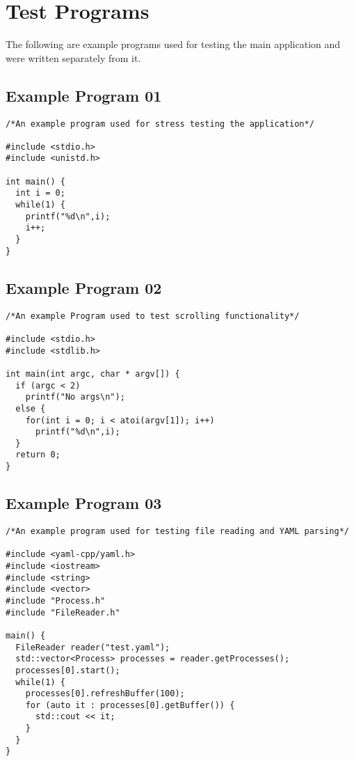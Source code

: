 \section{Test Programs}

The following are example programs used for testing the main application and were written separately from it.

\subsection{Example Program 01}

\begin{verbatim}
/*An example program used for stress testing the application*/

#include <stdio.h>
#include <unistd.h>

int main() {
  int i = 0;
  while(1) {
    printf("%d\n",i);
    i++;
  }
}
\end{verbatim}

\subsection{Example Program 02}

\begin{verbatim}
/*An example Program used to test scrolling functionality*/

#include <stdio.h>
#include <stdlib.h>

int main(int argc, char * argv[]) {
  if (argc < 2)
    printf("No args\n");
  else {
    for(int i = 0; i < atoi(argv[1]); i++)
      printf("%d\n",i);
  }
  return 0;
}
\end{verbatim}

\subsection{Example Program 03}

\begin{verbatim}
/*An example program used for testing file reading and YAML parsing*/

#include <yaml-cpp/yaml.h>
#include <iostream>
#include <string>
#include <vector>
#include "Process.h"
#include "FileReader.h"

main() {
  FileReader reader("test.yaml");
  std::vector<Process> processes = reader.getProcesses();
  processes[0].start();
  while(1) {
    processes[0].refreshBuffer(100);
    for (auto it : processes[0].getBuffer()) {
      std::cout << it;
    }
  }
}
\end{verbatim}

